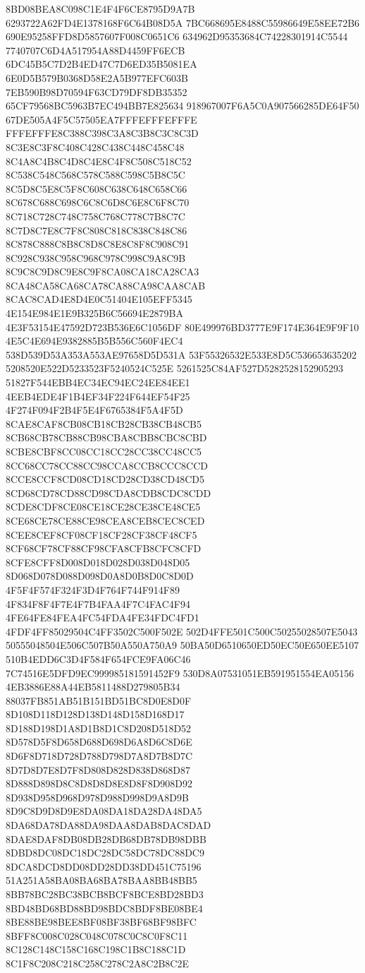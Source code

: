 8BD08BEA8C098C1E4F4F6CE8795D9A7B
6293722A62FD4E1378168F6C64B08D5A
7BC668695E8488C55986649E58EE72B6
690E95258FFD8D5857607F008C0651C6
634962D95353684C74228301914C5544
7740707C6D4A517954A88D4459FF6ECB
6DC45B5C7D2B4ED47C7D6ED35B5081EA
6E0D5B579B0368D58E2A5B977EFC603B
7EB590B98D70594F63CD79DF8DB35352
65CF79568BC5963B7EC494BB7E825634
918967007F6A5C0A907566285DE64F50
67DE505A4F5C57505EA7FFFEFFFEFFFE
FFFEFFFE8C388C398C3A8C3B8C3C8C3D
8C3E8C3F8C408C428C438C448C458C48
8C4A8C4B8C4D8C4E8C4F8C508C518C52
8C538C548C568C578C588C598C5B8C5C
8C5D8C5E8C5F8C608C638C648C658C66
8C678C688C698C6C8C6D8C6E8C6F8C70
8C718C728C748C758C768C778C7B8C7C
8C7D8C7E8C7F8C808C818C838C848C86
8C878C888C8B8C8D8C8E8C8F8C908C91
8C928C938C958C968C978C998C9A8C9B
8C9C8C9D8C9E8C9F8CA08CA18CA28CA3
8CA48CA58CA68CA78CA88CA98CAA8CAB
8CAC8CAD4E8D4E0C51404E105EFF5345
4E154E984E1E9B325B6C56694E2879BA
4E3F53154E47592D723B536E6C1056DF
80E499976BD3777E9F174E364E9F9F10
4E5C4E694E9382885B5B556C560F4EC4
538D539D53A353A553AE97658D5D531A
53F55326532E533E8D5C536653635202
5208520E522D5233523F5240524C525E
5261525C84AF527D5282528152905293
51827F544EBB4EC34EC94EC24EE84EE1
4EEB4EDE4F1B4EF34F224F644EF54F25
4F274F094F2B4F5E4F6765384F5A4F5D
8CAE8CAF8CB08CB18CB28CB38CB48CB5
8CB68CB78CB88CB98CBA8CBB8CBC8CBD
8CBE8CBF8CC08CC18CC28CC38CC48CC5
8CC68CC78CC88CC98CCA8CCB8CCC8CCD
8CCE8CCF8CD08CD18CD28CD38CD48CD5
8CD68CD78CD88CD98CDA8CDB8CDC8CDD
8CDE8CDF8CE08CE18CE28CE38CE48CE5
8CE68CE78CE88CE98CEA8CEB8CEC8CED
8CEE8CEF8CF08CF18CF28CF38CF48CF5
8CF68CF78CF88CF98CFA8CFB8CFC8CFD
8CFE8CFF8D008D018D028D038D048D05
8D068D078D088D098D0A8D0B8D0C8D0D
4F5F4F574F324F3D4F764F744F914F89
4F834F8F4F7E4F7B4FAA4F7C4FAC4F94
4FE64FE84FEA4FC54FDA4FE34FDC4FD1
4FDF4FF85029504C4FF3502C500F502E
502D4FFE501C500C50255028507E5043
50555048504E506C507B50A550A750A9
50BA50D6510650ED50EC50E650EE5107
510B4EDD6C3D4F584F654FCE9FA06C46
7C74516E5DFD9EC999985181591452F9
530D8A07531051EB591951554EA05156
4EB3886E88A44EB5811488D279805B34
88037FB851AB51B151BD51BC8D0E8D0F
8D108D118D128D138D148D158D168D17
8D188D198D1A8D1B8D1C8D208D518D52
8D578D5F8D658D688D698D6A8D6C8D6E
8D6F8D718D728D788D798D7A8D7B8D7C
8D7D8D7E8D7F8D808D828D838D868D87
8D888D898D8C8D8D8D8E8D8F8D908D92
8D938D958D968D978D988D998D9A8D9B
8D9C8D9D8D9E8DA08DA18DA28DA48DA5
8DA68DA78DA88DA98DAA8DAB8DAC8DAD
8DAE8DAF8DB08DB28DB68DB78DB98DBB
8DBD8DC08DC18DC28DC58DC78DC88DC9
8DCA8DCD8DD08DD28DD38DD451C75196
51A251A58BA08BA68BA78BAA8BB48BB5
8BB78BC28BC38BCB8BCF8BCE8BD28BD3
8BD48BD68BD88BD98BDC8BDF8BE08BE4
8BE88BE98BEE8BF08BF38BF68BF98BFC
8BFF8C008C028C048C078C0C8C0F8C11
8C128C148C158C168C198C1B8C188C1D
8C1F8C208C218C258C278C2A8C2B8C2E
